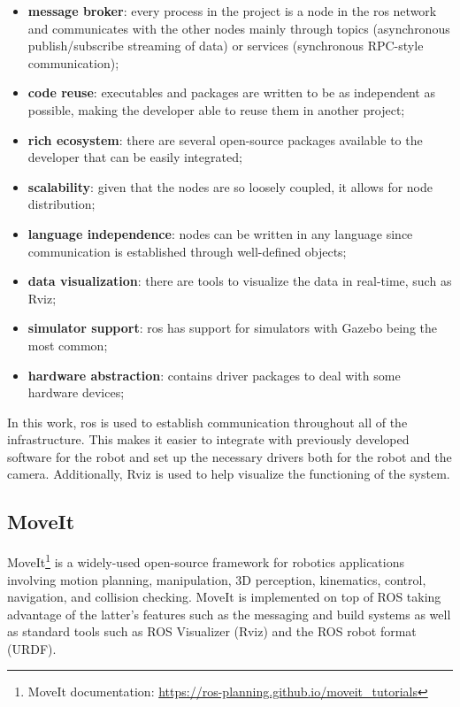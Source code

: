 \begin{itemize}
    \item \textbf{message broker}: every process in the project is a node in the \acs{ros} network and communicates with the other nodes mainly through topics (asynchronous publish/subscribe streaming of data) or services (synchronous RPC-style communication);
    \item \textbf{code reuse}: executables and packages are written to be as independent as possible, making the developer able to reuse them in another project;
    \item \textbf{rich ecosystem}: there are several open-source packages available to the developer that can be easily integrated;
    \item \textbf{scalability}: given that the nodes are so loosely coupled, it allows for node distribution;
    \item \textbf{language independence}: nodes can be written in any language since communication is established through well-defined objects;
    \item \textbf{data visualization}: there are tools to visualize the data in real-time, such as Rviz;
    \item \textbf{simulator support}: \acs{ros} has support for simulators with Gazebo being the most common;
    \item \textbf{hardware abstraction}: contains driver packages to deal with some hardware devices;
\end{itemize}

In this work, \acs{ros} is used to establish communication throughout all of the infrastructure. This makes it easier to integrate with previously developed software for the robot and set up the necessary drivers both for the robot and the camera. Additionally, Rviz is used to help visualize the functioning of the system.

\subsection{MoveIt}

MoveIt\footnote{MoveIt documentation: \url{https://ros-planning.github.io/moveit_tutorials}} is a widely-used open-source framework for robotics applications involving motion planning, manipulation, 3D perception, kinematics, control, navigation, and collision checking. MoveIt is implemented on top of ROS taking advantage of the latter's features such as the messaging and build systems as well as standard tools such as ROS Visualizer (Rviz) and the ROS robot format (URDF).

